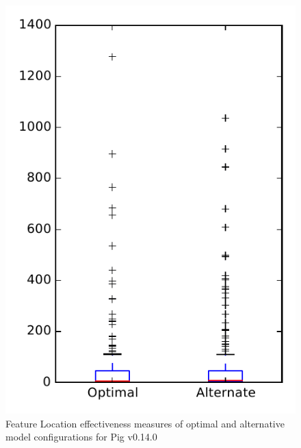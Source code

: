 
\begin{figure}
\centering
\includegraphics[height=0.4\textheight]{figures/combo/flt_rq1_pig}
\caption{Feature Location effectiveness measures of optimal and alternative model configurations for Pig v0.14.0}
\label{fig:combo:flt:rq1:pig}
\end{figure}
